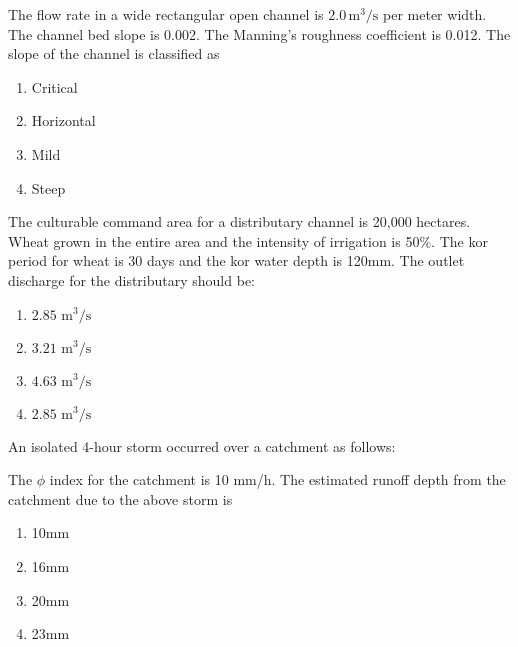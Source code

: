 \item{
        	
        	The flow rate in a wide rectangular open channel is $2.0 \, \text{m}^3/\text{s}$ per meter width. The channel bed slope is 0.002. The Manning’s roughness coefficient is 0.012. The slope of the channel is classified as
        	\hfill
        	
        	\begin{multicols}{4}
        		\begin{enumerate}
        			\item Critical  
        			\item Horizontal  
        			\item Mild  
        			\item Steep  
        		\end{enumerate}
        	\end{multicols}
        	
        }
    \item{
     
           The culturable command area for a distributary channel is 20,000 hectares. Wheat grown in the entire area and the intensity of irrigation is 50\%. The kor period for wheat is 30 days and the kor water depth is 120mm. The outlet discharge for the distributary should be:\hfill
                
            \begin{multicols}{4}
                \begin{enumerate}
                	\item $2.85 \text{ m}^3/\text{s}$ 
                	
                	\item $3.21 \text{ m}^3/\text{s}$ 
                	
                	\item $4.63 \text{ m}^3/\text{s}$ 
                	
                	\item $2.85 \text{ m}^3/\text{s}$
                \end{enumerate}
            \end{multicols}
        
        }
 	\item{
        	An isolated 4-hour storm occurred over a catchment as follows:
        	
        	
        	
        	The $\phi$ index for the catchment is 10 mm/h. The estimated runoff depth from the catchment due to the above storm is\text{ }
        	\hfill
        	
        	
        	\begin{multicols}{4}
        		\begin{enumerate}
        			\item 10mm
        			\item 16mm
        			\item 20mm
        			\item 23mm
        		\end{enumerate}
        	\end{multicols}
        	
        }

